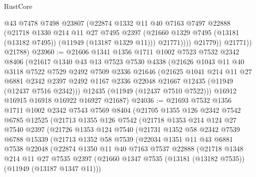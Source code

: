 \begin{lexlean}{RustCore}
\begin{coremodule}
                  @43
                  @7478
                  @7498
                  @23807
                  (@22874
                    @1332
                    @11
                    @40
                    @7163
                    @7497
                    @22888
                    (@21718
                      @1330
                      @214
                      @11
                      @27
                      @7495
                      @2397
                      (@21660 @1329 @7495 (@13181 (@13182 @7495)) (@11949 (@13187 @1329 @11)))
                      @21771))))
              @21779))
          @21771))
      @21788)
@23960 := @21606
    @1341
    @1356
    @1711
    @1002
    @7523
    @7532
    @2342
    @8406
    (@21617
      @1340
      @43
      @13
      @7523
      @7530
      @4338
      (@21626
        @1043
        @11
        @40
        @3118
        @7522
        @7529
        @2492
        @7509
        @2336
        @21646
        (@21625
          @1041
          @214
          @11
          @27
          @6881
          @2342
          @2397
          @2492
          @1167
          @2336
          @22048
          @21667
          @12435
          (@11949 (@12437 @7516 @2342)))
        @12435
        (@11949 (@12437 @7510 @7522)))
      @16912
      @16915
      @16918
      @16922
      @16927
      @21687)
@24036 := @21693
    @7532
    @1356
    @1711
    @1002
    @2342
    @7543
    @7569
    @8404
    (@21705
      @1355
      @126
      @2342
      @7542
      @6785
      @12525
      (@21713
        @1355
        @126
        @7542
        (@21718
          @1353
          @214
          @124
          @27
          @7540
          @2397
          (@21726
            @1353
            @124
            @7540
            (@21731
              @1352
              @58
              @2342
              @7539
              @6788
              @15339
              (@21713
                @1352
                @58
                @7539
                (@22034
                  @1351
                  @11
                  @43
                  @6881
                  @7538
                  @22048
                  (@22874
                    @1350
                    @11
                    @40
                    @7163
                    @7537
                    @22888
                    (@21718
                      @1348
                      @214
                      @11
                      @27
                      @7535
                      @2397
                      (@21660 @1347 @7535 (@13181 (@13182 @7535)) (@11949 (@13187 @1347 @11)))

\end{coremodule}
\end{lexlean}

